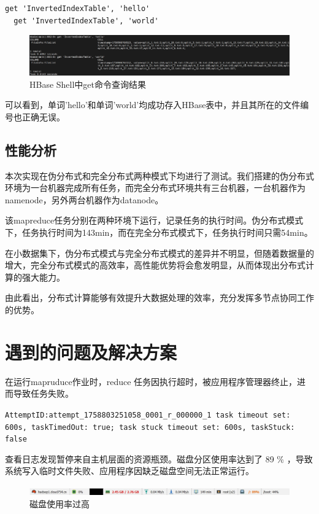 \documentclass[]{bitreport}
\begin{document}
\begin{lstlisting}[style=shell]
  get 'InvertedIndexTable', 'hello'
  get 'InvertedIndexTable', 'world'
\end{lstlisting}
\begin{figure}[H]
  \centering
  \includegraphics[width=0.9\linewidth]{figures/hbase_get.jpg}
  \caption{HBase Shell中get命令查询结果}
  \label{fig:hbase_get}
\end{figure}
可以看到，单词'hello'和单词'world'均成功存入HBase表中，并且其所在的文件编号也正确无误。

\subsection{性能分析}
本次实现在伪分布式和完全分布式两种模式下均进行了测试。我们搭建的伪分布式环境为一台机器完成所有任务，而完全分布式环境共有三台机器，一台机器作为namenode，另外两台机器作为datanode。

该mapreduce任务分别在两种环境下运行，记录任务的执行时间。伪分布式模式下，任务执行时间为143min，而在完全分布式模式下，任务执行时间只需54min。

在小数据集下，伪分布式模式与完全分布式模式的差异并不明显，但随着数据量的增大，完全分布式模式的高效率，高性能优势将会愈发明显，从而体现出分布式计算的强大能力。

由此看出，分布式计算能够有效提升大数据处理的效率，充分发挥多节点协同工作的优势。

\section{遇到的问题及解决方案}

在运行mapruduce作业时，reduce 任务因执行超时，被应用程序管理器终止，进而导致任务失败。

\lstinline[style=shell]{AttemptID:attempt_1758803251058_0001_r_000000_1 task timeout set: 600s, taskTimedOut: true; task stuck timeout set: 600s, taskStuck: false}

查看日志发现暂停来自主机层面的资源瓶颈。磁盘分区使用率达到了 89 \% ，导致系统写入临时文件失败、应用程序因缺乏磁盘空间无法正常运行。

\begin{figure}[H]
  \centering
  \includegraphics[width=0.8\linewidth]{figures/disk_usage.jpg}
  \caption{磁盘使用率过高}
\end{figure}
\end{document}
